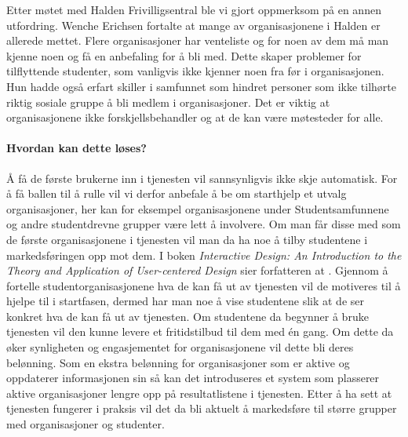 Etter møtet med Halden Frivilligsentral ble vi gjort oppmerksom på en annen utfordring. Wenche Erichsen fortalte at mange av organisasjonene i Halden er allerede mettet. Flere organisasjoner har venteliste og for noen av dem må man kjenne noen og få en anbefaling for å bli med. Dette skaper problemer for tilflyttende studenter, som vanligvis ikke kjenner noen fra før i organisasjonen. Hun hadde også erfart skiller i samfunnet som hindret personer som ikke tilhørte riktig sosiale gruppe å bli medlem i organisasjoner. Det er viktig at organisasjonene ikke forskjellsbehandler og at de kan være møtesteder for alle. \cite{FRIVILLIGSENTRALEN-INTERVJU:21}


\paragraph{Hvordan kan dette løses?}
Å få de første brukerne inn i tjenesten vil sannsynligvis ikke skje automatisk. For å få ballen til å rulle vil vi derfor anbefale å be om starthjelp et utvalg organisasjoner, her kan for eksempel organisasjonene under Studentsamfunnene og andre studentdrevne grupper være lett å involvere. Om man får disse med som de første organisasjonene i tjenesten vil man da ha noe å tilby studentene i markedsføringen opp mot dem. I boken {\em Interactive Design: An Introduction to the Theory and Application of User-centered Design} sier forfatteren at  \cite[123]{INTERACTIVE-DESIGN:19}. Gjennom å fortelle studentorganisasjonene hva de kan få ut av tjenesten vil de motiveres til å hjelpe til i startfasen, dermed har man noe å vise studentene slik at de ser konkret hva de kan få ut av tjenesten. Om studentene da begynner å bruke tjenesten vil den kunne levere et fritidstilbud til dem med én gang. Om dette da øker synligheten og engasjementet for organisasjonene vil dette bli deres belønning. Som en ekstra belønning for organisasjoner som er aktive og oppdaterer informasjonen sin så kan det introduseres et system som plasserer aktive organisasjoner lengre opp på resultatlistene i tjenesten. Etter å ha sett at tjenesten fungerer i praksis vil det da bli aktuelt å markedsføre til større grupper med organisasjoner og studenter. 


